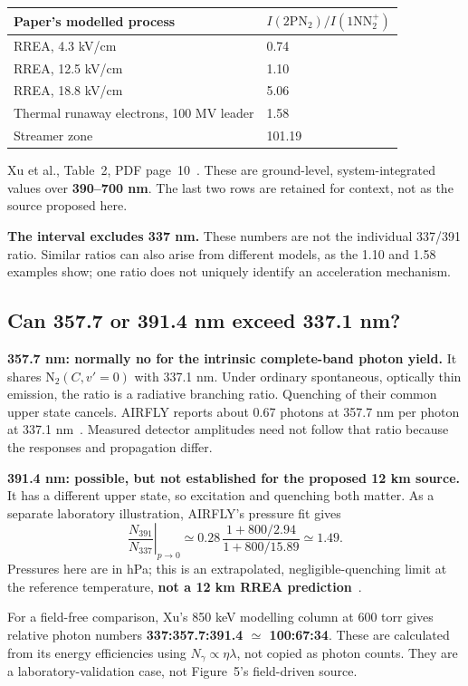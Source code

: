 \documentclass[11pt,a4paper]{article}
\newcommand{\TwoP}{\ensuremath{2\mathrm{P}\mathrm{N}_2}}
\newcommand{\OneN}{\ensuremath{1\mathrm{N}\mathrm{N}_2^{+}}}
\newcommand{\xu}[1]{\cite[#1]{Xu2015}}
\newcommand{\source}[1]{{\small\color{muted}#1}\par}
\begin{document}
\begin{center}
\begin{tabularx}{\textwidth}{@{}Y P{34mm}@{}}
\toprule
\textbf{Paper's modelled process} & $I(\TwoP)/I(\OneN)$\\
\midrule
RREA, 4.3 kV/cm & 0.74\\
RREA, 12.5 kV/cm & 1.10\\
RREA, 18.8 kV/cm & 5.06\\
Thermal runaway electrons, 100 MV leader & 1.58\\
Streamer zone & 101.19\\
\bottomrule
\end{tabularx}
\end{center}
\source{Xu et al., Table~2, PDF page~10~\cite{Xu2015}. These are ground-level, system-integrated values over \textbf{390--700 nm}. The last two rows are retained for context, not as the source proposed here.}

\textbf{The interval excludes 337 nm.} These numbers are not the individual 337/391 ratio. Similar ratios can also arise from different models, as the 1.10 and 1.58 examples show; one ratio does not uniquely identify an acceleration mechanism.\xu{Sec.~3.3}

\subsection*{Can 357.7 or 391.4 nm exceed 337.1 nm?}
\textbf{357.7 nm: normally no for the intrinsic complete-band photon yield.} It shares $\mathrm{N}_2(C,v'=0)$ with 337.1 nm. Under ordinary spontaneous, optically thin emission, the ratio is a radiative branching ratio. Quenching of their common upper state cancels. AIRFLY reports about 0.67 photons at 357.7 nm per photon at 337.1 nm~\cite{AIRFLY2007}. Measured detector amplitudes need not follow that ratio because the responses and propagation differ.

\textbf{391.4 nm: possible, but not established for the proposed 12 km source.} It has a different upper state, so excitation and quenching both matter. As a separate laboratory illustration, AIRFLY's pressure fit gives
\[
\left.\frac{N_{391}}{N_{337}}\right|_{p\rightarrow0}
\simeq0.28\,\frac{1+800/2.94}{1+800/15.89}\simeq1.49.
\]
Pressures here are in hPa; this is an extrapolated, negligible-quenching limit at the reference temperature, \textbf{not a 12 km RREA prediction}~\cite{AIRFLY2007}.

For a field-free comparison, Xu's 850 keV modelling column at 600 torr gives relative photon numbers \textbf{337:357.7:391.4 $\simeq$ 100:67:34}. These are calculated from its energy efficiencies using $N_\gamma\propto\eta\lambda$, not copied as photon counts. They are a laboratory-validation case, not Figure~5's field-driven source.\xu{Table~1}
\end{document}
